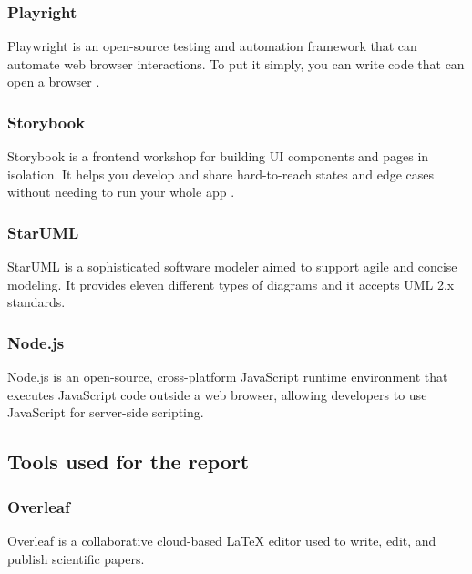 \subsubsection*{\protect{} Playright}

Playwright \cite{PlaywrightDocs2023} is an open-source testing and automation framework that can automate web browser interactions. To put it simply, you can write code that can open a browser \cite{DevOpsFoundation2023}.

\subsubsection*{\protect{} Storybook}

Storybook is a frontend workshop for building UI components and pages in isolation. It helps you develop and share hard-to-reach states and edge cases without needing to run your whole app \cite{MarcotteResponsiveWebDesign2023}.

\subsubsection*{\protect{} StarUML}

StarUML \cite{StarUMLWebsite} is a sophisticated software modeler aimed to support agile and concise modeling. It provides eleven different types of diagrams and it accepts UML 2.x standards.

\subsubsection*{\protect{} Node.js}

Node.js \cite{NodeJSWebsite} is an open-source, cross-platform JavaScript runtime environment that executes JavaScript code outside a web browser, allowing developers to use JavaScript for server-side scripting.

\subsection{Tools used for the report}

\subsubsection*{\protect{} Overleaf}

Overleaf is a collaborative cloud-based LaTeX editor used to write, edit, and publish scientific papers.

